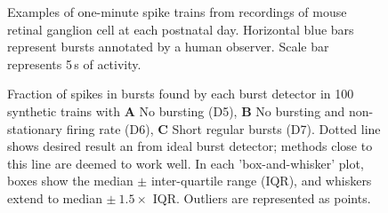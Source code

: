 \documentclass[12pt, titlepage]{article}
\begin{document}
		\clearpage
		\begin{figure}
			\centering
			\caption{Examples of one-minute spike trains from recordings of mouse retinal ganglion cell at each postnatal day. Horizontal blue bars represent bursts annotated by a human observer. Scale bar represents 5$\,$s of activity.}
			\label{RGC_eg}
		\end{figure}
		\clearpage
		\begin{figure}[h]
			\centering
			\caption{Fraction of spikes in bursts found by each burst detector in 100 synthetic trains with \textbf{A} No bursting (D5), \textbf{B}  No bursting and non-stationary firing rate (D6), \textbf{C} Short regular bursts (D7). Dotted line shows desired result an from ideal burst detector; methods close to this line are deemed to work well. In each 'box-and-whisker' plot, boxes show the median $\pm$ inter-quartile range (IQR), and whiskers extend to median $\pm \ 1.5\times$ IQR. Outliers are represented as points. }
			\label{sim_results1}
		\end{figure}
\end{document}
